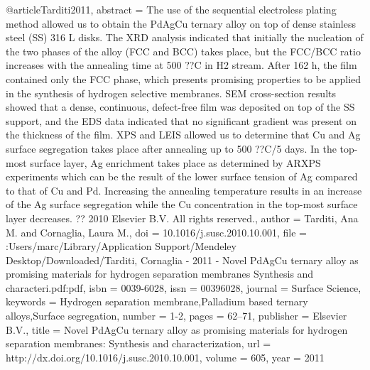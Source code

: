 @article{Tarditi2011,
abstract = {The use of the sequential electroless plating method allowed us to obtain the PdAgCu ternary alloy on top of dense stainless steel (SS) 316 L disks. The XRD analysis indicated that initially the nucleation of the two phases of the alloy (FCC and BCC) takes place, but the FCC/BCC ratio increases with the annealing time at 500 ??C in H2 stream. After 162 h, the film contained only the FCC phase, which presents promising properties to be applied in the synthesis of hydrogen selective membranes. SEM cross-section results showed that a dense, continuous, defect-free film was deposited on top of the SS support, and the EDS data indicated that no significant gradient was present on the thickness of the film. XPS and LEIS allowed us to determine that Cu and Ag surface segregation takes place after annealing up to 500 ??C/5 days. In the top-most surface layer, Ag enrichment takes place as determined by ARXPS experiments which can be the result of the lower surface tension of Ag compared to that of Cu and Pd. Increasing the annealing temperature results in an increase of the Ag surface segregation while the Cu concentration in the top-most surface layer decreases. ?? 2010 Elsevier B.V. All rights reserved.},
author = {Tarditi, Ana M. and Cornaglia, Laura M.},
doi = {10.1016/j.susc.2010.10.001},
file = {:Users/marc/Library/Application Support/Mendeley Desktop/Downloaded/Tarditi, Cornaglia - 2011 - Novel PdAgCu ternary alloy as promising materials for hydrogen separation membranes Synthesis and characteri.pdf:pdf},
isbn = {0039-6028},
issn = {00396028},
journal = {Surface Science},
keywords = {Hydrogen separation membrane,Palladium based ternary alloys,Surface segregation},
number = {1-2},
pages = {62--71},
publisher = {Elsevier B.V.},
title = {{Novel PdAgCu ternary alloy as promising materials for hydrogen separation membranes: Synthesis and characterization}},
url = {http://dx.doi.org/10.1016/j.susc.2010.10.001},
volume = {605},
year = {2011}
}
